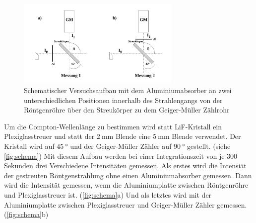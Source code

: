 \begin{figure}
    \centering
    \includegraphics[width=0.7\textwidth]{images/bild_4.png}
    \caption{Schematischer Versuchsaufbau mit dem Aluminiumabsorber an zwei unterschiedlichen Positionen innerhalb des Strahlengangs von der Röntgenröhre über den Streukörper zu dem Geiger-Müller Zählrohr\cite{V603}}
    \label{fig:schema}
\end{figure}

Um die Compton-Wellenlänge zu bestimmen wird statt LiF-Kristall ein Plexiglasstreuer und statt der $\SI{2}{\milli\metre}$ Blende eine $\SI{5}{\milli\metre}$ Blende verwendet.
Der Kristall wird auf $\SI{45}{\degree}$ und der Geiger-Müller Zähler auf $\SI{90}{\degree}$ gestellt. (siehe \autoref{fig:schema})
Mit diesem Aufbau werden bei einer Integrationszeit von je 300 Sekunden drei Verschiedene Intensitäten gemessen.
Als erstes wird die Intensiät der gestreuten Röntgenstrahlung ohne einen Aluminiumabsorber gemessen.
Dann wird die Intensität gemessen, wenn die Aluminiumplatte zwischen Röntgenröhre und Plexiglasstreuer ist. (\autoref{fig:schema}a)
Und als letztes wird mit der Aluminiumplatte zwischen Plexiglasstreuer und Geiger-Müller Zähler gemessen. (\autoref{fig:schema}b)